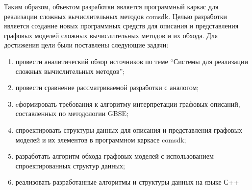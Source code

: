 Таким образом, объектом разработки является программный каркас для реализации сложных вычислительных методов comsdk. Целью разработки является создание новых программных средств для описания и представления графовых моделей сложных вычислительных методов и их обхода. Для достижения цели были поставлены следующие задачи:
\begin{enumerate}[1)]
  \item провести аналитический обзор источников по теме ``Системы для реализации сложных вычислительных методов'';
  \item провести сравнение рассматриваемой разработки с аналогом;
  \item cформировать требования к алгоритму интерпретации графовых описаний, составленных по методологии GBSE;
  \item спроектировать структуры данных для описания и представления графовых моделей и их элементов в программном каркасе comsdk;
  \item разработать алгоритм обхода графовых моделей с использованием спроектированных структур данных;
  \item реализовать разработанные алгоритмы и структуры данных на языке С++
\end{enumerate}